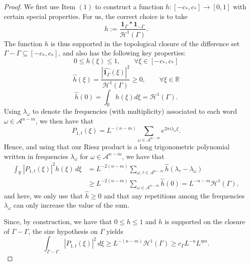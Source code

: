 \documentclass[12pt]{amsart}
\numberwithin{equation}{section}
\begin{document}
\begin{proof}
We first use Item $(1)$ to construct a function $h :[-c_*, c_*] \rightarrow [0,1]$ with certain special properties. For us, the correct choice is to take
$$
h:=\frac{\mathbf1_\Gamma*\mathbf1_{-\Gamma}}{\mathcal{H}^1(\Gamma)}.
$$
The function $h$ is thus supported in the topological closure of the difference set $\Gamma - \Gamma \subseteq [-c_*,c_*]$, and also has the following key properties:
$$
 0\leq h(\xi) \leq 1, \qquad \forall \xi \in [-c_*,c_*]
$$
$$
 \widehat h(\xi)= \frac{|\widehat{\mathbf1_\Gamma}(\xi)|^2}{\mathcal{H}^1(\Gamma)} \geq 0, \qquad \forall\xi \in \mathbb R
$$
$$
\widehat h(0)=\int_{\mathbb{R}} h (\xi) d \xi =\mathcal{H}^1 (\Gamma).
$$
Using $\lambda_\omega$ to denote the frequencies (with multiplicity) associated to each word$\omega\in\mathcal A^{n-m}$, we then have that
\[
 P_{1,t}(\xi)=L^{-(n-m)}\sum_{\omega\in\mathcal A^{n-m}}
 e^{2\pi i\lambda_\omega\xi}.
\]
Hence, and using that our Riesz product is a long trigonometric polynomial written in frequencies $\lambda_{\omega}$ for $\omega \in \mathcal{A}^{n-m}$, we have that
\begin{align*}
 \int_{\mathbb R}|P_{1,t}(\xi)|^2h(\xi)\,d\xi
 &=L^{-2(n-m)}\sum_{\omega,\tau\in\mathcal A^{n-m}}
 \widehat h(\lambda_\tau-\lambda_\omega)\\
 &\geq L^{-2(n-m)}\sum_{\omega\in\mathcal A^{n-m}}\widehat h(0)
 =L^{-{n-m}}\mathcal{H}^1 (\Gamma),
\end{align*}
and here, we only use that $\widehat h\geq0$ and that any repetitions among the frequencies
$\lambda_\omega$ can only increase the value of the sum.

Since, by construction, we have that $0 \leq h\leq1$ and $h$ is supported on the closure of $\Gamma - \Gamma$, the size hypothesis on $\Gamma$ yields
\begin{equation}\label{eq:salemparameterneutral}
 \int_{\Gamma-\Gamma}|P_{1,t}(\xi)|^2\,d\xi
 \geq L^{-(n-m)} \mathcal{H}^1 (\Gamma)
 \geq c_{\Gamma}L^{-n}L^{\eta m}.
\end{equation}


\end{proof}
\end{document}
